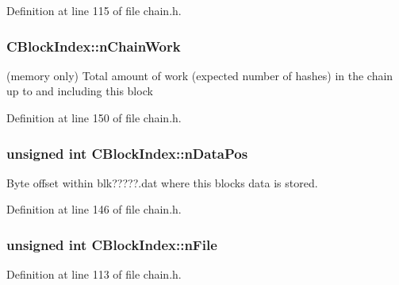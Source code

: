 Definition at line 115 of file chain.\+h.

\hypertarget{class_c_block_index_a8451dbcf199348b9efe4ee3625e9b0f0}{}
\subsubsection[{n\+Chain\+Work}]{ C\+Block\+Index\+::n\+Chain\+Work}\label{class_c_block_index_a8451dbcf199348b9efe4ee3625e9b0f0}


(memory only) Total amount of work (expected number of hashes) in the chain up to and including this block 



Definition at line 150 of file chain.\+h.

\hypertarget{class_c_block_index_af164283dfb2d62ac44be8d10446bce4a}{}
\subsubsection[{n\+Data\+Pos}]{\setlength{\rightskip}{0pt plus 5cm}unsigned int C\+Block\+Index\+::n\+Data\+Pos}\label{class_c_block_index_af164283dfb2d62ac44be8d10446bce4a}


Byte offset within blk?????.dat where this block\textquotesingle{}s data is stored. 



Definition at line 146 of file chain.\+h.

\hypertarget{class_c_block_index_a3bf9ecd8938c42be6a4b14d3c7ef5c21}{}
\subsubsection[{n\+File}]{\setlength{\rightskip}{0pt plus 5cm}unsigned int C\+Block\+Index\+::n\+File}\label{class_c_block_index_a3bf9ecd8938c42be6a4b14d3c7ef5c21}


Definition at line 113 of file chain.\+h.

\hypertarget{class_c_block_index_a02aaba7d27ec615e6f9f740353d839de}{}
